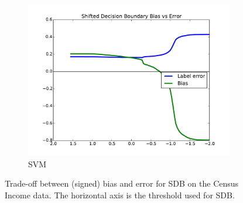 \documentclass[conference]{IEEEtran}
\begin{document}
\begin{figure}[t]
\begin{subfigure}{.7\columnwidth}
\includegraphics[width=\columnwidth]{images/adult-svm-T.pdf}%
\caption{SVM}%
\label{fig:adult_svm_tradeoff}%
\end{subfigure}%
\caption{Trade-off between (signed) bias and error for SDB on the Census Income data. The horizontal axis is the threshold used for SDB.}
\label{fig:adult_tradeoffs}
\end{figure}
\end{document}
